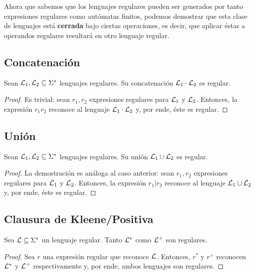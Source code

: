 Ahora que sabemos que los lenguajes regulares pueden ser generados por tanto expresiones regulares como autómatas finitos, podemos demostrar que esta clase de lenguajes está \textbf{cerrada} bajo ciertas operaciones, es decir, que aplicar éstas a operandos regulares resultará en otro lenguaje regular.

\subsection{Concatenación}

\begin{theorem*}
    Sean $\mathcal{L}_1, \mathcal{L}_2 \subseteq \Sigma^*$ lenguajes regulares. Su concatenación $\mathcal{L}_1 \cdot \mathcal{L}_2$ es regular.
\end{theorem*}
\begin{proof}
    Es trivial: sean $r_1, r_2$ expresiones regulares para $\mathcal{L}_1$ y $\mathcal{L}_2$. Entonces, la expresión $r_1 r_2$ reconoce al lenguaje $\mathcal{L}_1 \cdot \mathcal{L}_2$ y, por ende, éste es regular.
\end{proof}

\subsection{Unión}

\begin{theorem*}
    Sean $\mathcal{L}_1, \mathcal{L}_2 \subseteq \Sigma^*$ lenguajes regulares. Su unión $\mathcal{L}_1 \cup \mathcal{L}_2$ es regular.
\end{theorem*}
\begin{proof}
    La demostración es análoga al caso anterior: sean $r_1, r_2$ expresiones regulares para $\mathcal{L}_1$ y $\mathcal{L}_2$. Entonces, la expresión $r_1|r_2$ reconoce al lenguaje $\mathcal{L}_1 \cup \mathcal{L}_2$ y, por ende, éste es regular.
\end{proof}

\subsection{Clausura de Kleene/Positiva}

\begin{theorem*}
    Sea $\mathcal{L} \subseteq \Sigma^*$ un lenguaje regular. Tanto $\mathcal{L}^*$ como $\mathcal{L}^+$ son regulares.
\end{theorem*}
\begin{proof}
    Sea $r$ una expresión regular que reconoce $\mathcal{L}$. Entonces, $r^*$ y $r^+$ reconocen $\mathcal{L}^*$ y $\mathcal{L}^+$ respectivamente y, por ende, ambos lenguajes son regulares.
\end{proof}

